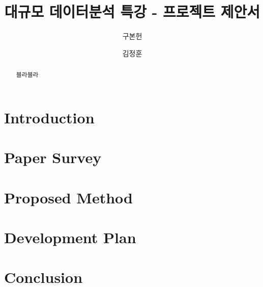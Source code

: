 \documentclass[sigconf, screen]{acmart}
\begin{document}
\title[Super Mario RL]{대규모 데이터분석 특강 - 프로젝트 제안서}

\author{구본헌}

\author{김정훈}

\begin{abstract}
블라블라~\cite{GYMMario}
\end{abstract}


\maketitle
\section{Introduction}
\label{sec:intro}


\section{Paper Survey}
\label{sec:survey}







\section{Proposed Method}
\label{sec:method}


\section{Development Plan}
\label{sec:plan}


\section{Conclusion}
\label{sec:conclusion}




\end{document}
